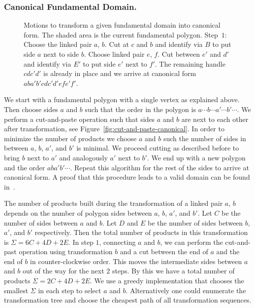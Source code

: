 \documentclass[Thesis]{subfiles}
\begin{document}
\subsubsection*{Canonical Fundamental Domain.}

\begin{figure}
\centering
{}
\caption{Motions to transform a given fundamental domain into canonical form. The shaded area is the current fundamental polygon. Step~$1$: Choose the linked pair $a$, $b$. Cut at $c$ and $b$ and identify via $B$ to put side $a$ next to side $b$. Choose linked pair $e$, $f$. Cut between $e'$ and $d'$ and identify via $E'$ to put side $e'$ next to $f'$. The remaining handle $cdc'd'$ is already in place and we arrive at canonical form $aba'b'cdc'd'efe'f'$.}
\label{fig:canonical_algorithm}
\end{figure}

We start with a fundamental polygon with a single vertex as explained above. 
Then choose sides $a$ and $b$ such that the order in the polygon is $a\cdots b \cdots a' \cdots b' \cdots$. 
We perform a cut-and-paste operation such that sides $a$ and $b$ are next to each other after transformation, see Figure~\ref{fig:cut-and-paste-canonical}. 
In order to minimize the number of products we choose $a$ and $b$ such the number of sides in between $a$, $b$, $a'$, and $b'$ is minimal. 
We proceed cutting as described before to bring $b$ next to $a'$ and analogously $a'$ next to $b'$. 
We end up with a new polygon and the order $aba'b'\cdots$. 
Repeat this algorithm for the rest of the sides to arrive at canonical form. 
A proof that this procedure leads to a valid domain can be found in~\cite{Jost2007}.

The number of products built during the transformation of a linked pair $a$, $b$ depends on the number of polygon sides between $a$, $b$, $a'$, and $b'$. 
Let $C$ be the number of sides between $a$ and $b$. Let $D$ and $E$ be the number of sides between $b$, $a'$, and $b'$ respectively. 
Then the total number of products in this transformation is $\Sigma=6C+4D+2E$. 
In step $1$, connecting $a$ and $b$, we can perform the cut-and-past operation using transformation $b$ and a cut between the end of $a$ and the end of $b$ in counter-clockwise order. 
This moves the intermediate sides between $a$ and $b$ out of the way for the next $2$ steps. 
By this we have a total number of products $\Sigma=2C+4D+2E$. 
We use a greedy implementation that chooses the smallest $\Sigma$ in each step to select $a$ and $b$.
Alternatively one could enumerate the transformation tree and choose the cheapest path of all transformation sequences.
\end{document}
